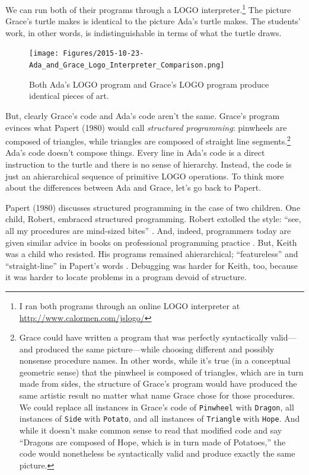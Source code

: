 We can run both of their programs through a LOGO interpreter.\footnote{I ran both programs through an online LOGO interpreter at \url{http://www.calormen.com/jslogo/}} The picture Grace's turtle makes is identical to the picture Ada's turtle makes. The students' work, in other words, is indistinguishable in terms of what the turtle draws.

\begin{figure}[htbp]
\centering
\texttt{[image: Figures/2015-10-23-Ada\_and\_Grace\_Logo\_Interpreter\_Comparison.png]}
\caption{Both Ada's LOGO program and Grace's LOGO program produce identical pieces of art.}
\end{figure}

But, clearly Grace's code and Ada's code aren't the same. Grace's program evinces what Papert (1980) would call \emph{structured programming}: pinwheels are composed of triangles, while triangles are composed of straight line segments.\footnote{Grace could have written a program that was perfectly syntactically valid---and produced the same picture---while choosing different and possibly nonsense procedure names. In other words, while it's true (in a conceptual geometric sense) that the pinwheel is composed of triangles, which are in turn made from sides, the structure of Grace's program would have produced the same artistic result no matter what name Grace chose for those procedures. We could replace all instances in Grace's code of \texttt{Pinwheel} with \texttt{Dragon}, all instances of \texttt{Side} with \texttt{Potato}, and all instances of \texttt{Triangle} with \texttt{Hope}. And while it doesn't make common sense to read that modified code and say ``Dragons are composed of Hope, which is in turn made of Potatoes,'' the code would nonetheless be syntactically valid and produce exactly the same picture.} Ada's code doesn't compose things. Every line in Ada's code is a direct instruction to the turtle and there is no sense of hierarchy. Instead, the code is just an ahierarchical sequence of primitive LOGO operations. To think more about the differences between Ada and Grace, let's go back to Papert.

Papert (1980) discusses structured programming in the case of two children. One child, Robert, embraced structured programming. Robert extolled the style: ``see, all my procedures are mind-sized bites'' \citep[ p.~103]{papert_mindstorms_1980}. And, indeed, programmers today are given similar advice in books on professional programming practice \citep{martin_clean_2009}. But, Keith was a child who resisted. His programs remained ahierarchical; ``featureless'' and ``straight-line'' in Papert's words \citep[ pp.~102-103]{papert_mindstorms_1980} . Debugging was harder for Keith, too, because it was harder to locate problems in a program devoid of structure.


